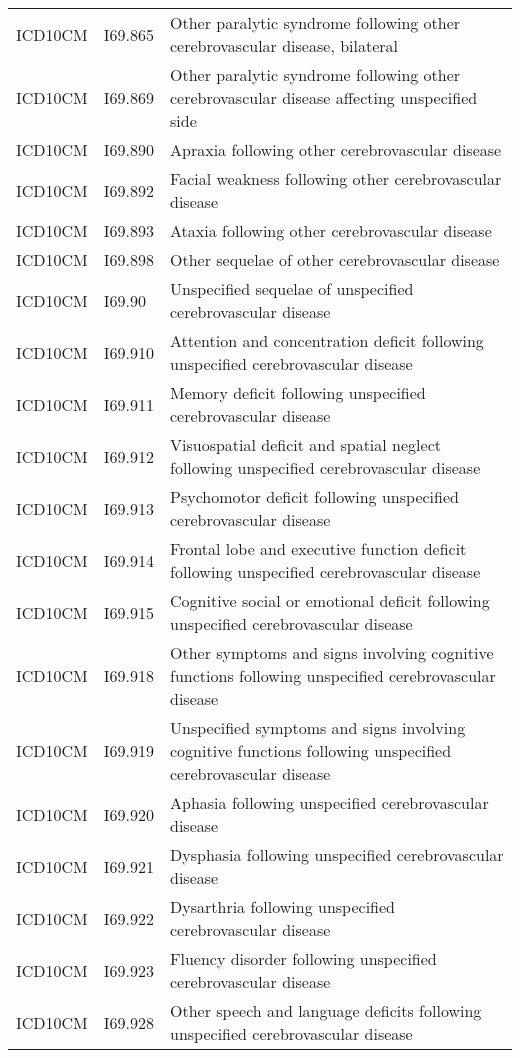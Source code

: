 \begin{longtable}{p{}p{}p{}}
  ICD10CM & I69.865 & Other paralytic syndrome following other cerebrovascular disease, bilateral \\ 
  ICD10CM & I69.869 & Other paralytic syndrome following other cerebrovascular disease affecting unspecified side \\ 
  ICD10CM & I69.890 & Apraxia following other cerebrovascular disease \\ 
  ICD10CM & I69.892 & Facial weakness following other cerebrovascular disease \\ 
  ICD10CM & I69.893 & Ataxia following other cerebrovascular disease \\ 
  ICD10CM & I69.898 & Other sequelae of other cerebrovascular disease \\ 
  ICD10CM & I69.90 & Unspecified sequelae of unspecified cerebrovascular disease \\ 
  ICD10CM & I69.910 & Attention and concentration deficit following unspecified cerebrovascular disease \\ 
  ICD10CM & I69.911 & Memory deficit following unspecified cerebrovascular disease \\ 
  ICD10CM & I69.912 & Visuospatial deficit and spatial neglect following unspecified cerebrovascular disease \\ 
  ICD10CM & I69.913 & Psychomotor deficit following unspecified cerebrovascular disease \\ 
  ICD10CM & I69.914 & Frontal lobe and executive function deficit following unspecified cerebrovascular disease \\ 
  ICD10CM & I69.915 & Cognitive social or emotional deficit following unspecified cerebrovascular disease \\ 
  ICD10CM & I69.918 & Other symptoms and signs involving cognitive functions following unspecified cerebrovascular disease \\ 
  ICD10CM & I69.919 & Unspecified symptoms and signs involving cognitive functions following unspecified cerebrovascular disease \\ 
  ICD10CM & I69.920 & Aphasia following unspecified cerebrovascular disease \\ 
  ICD10CM & I69.921 & Dysphasia following unspecified cerebrovascular disease \\ 
  ICD10CM & I69.922 & Dysarthria following unspecified cerebrovascular disease \\ 
  ICD10CM & I69.923 & Fluency disorder following unspecified cerebrovascular disease \\ 
  ICD10CM & I69.928 & Other speech and language deficits following unspecified cerebrovascular disease \\ 

\end{longtable}
